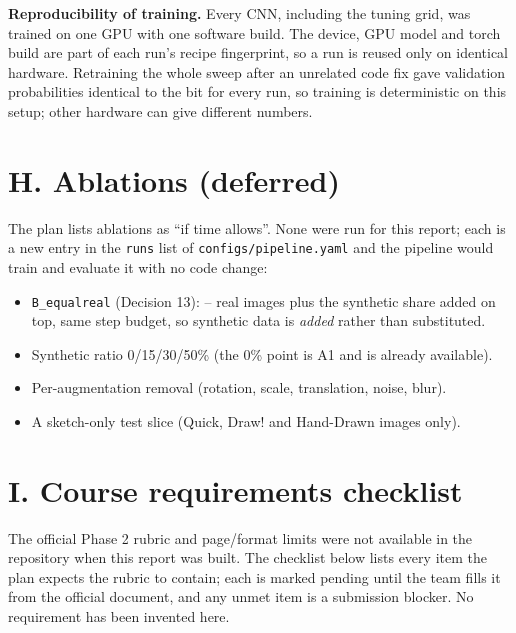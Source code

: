 \documentclass[11pt]{article}
\providecommand{\BatchSize}{--}
\begin{document}
\textbf{Reproducibility of training.} Every CNN, including the tuning grid, was
trained on one GPU with one software build. The device, GPU model and torch
build are part of each run's recipe fingerprint, so a run is reused only on
identical hardware. Retraining the whole sweep after an unrelated code fix gave
validation probabilities identical to the bit for every run, so training is
deterministic on this setup; other hardware can give different numbers.

\section*{H. Ablations (deferred)}

The plan lists ablations as ``if time allows''. None were run for this
report; each is a new entry in the \texttt{runs} list of
\nolinkurl{configs/pipeline.yaml} and the pipeline would train and evaluate it
with no code change:
\begin{itemize}
  \item \texttt{B\_equalreal} (Decision 13): \BatchSize{} real images plus the
        synthetic share added on top, same step budget, so synthetic data is
        \emph{added} rather than substituted.
  \item Synthetic ratio 0/15/30/50\% (the 0\% point is A1 and is already
        available).
  \item Per-augmentation removal (rotation, scale, translation, noise, blur).
  \item A sketch-only test slice (Quick, Draw! and Hand-Drawn images only).
\end{itemize}

\section*{I. Course requirements checklist}

The official Phase 2 rubric and page/format limits were not available in the
repository when this report was built. The checklist below lists every item
the plan expects the rubric to contain; each is marked pending until the team
fills it from the official document, and any unmet item is a submission
blocker. No requirement has been invented here.
\end{document}
